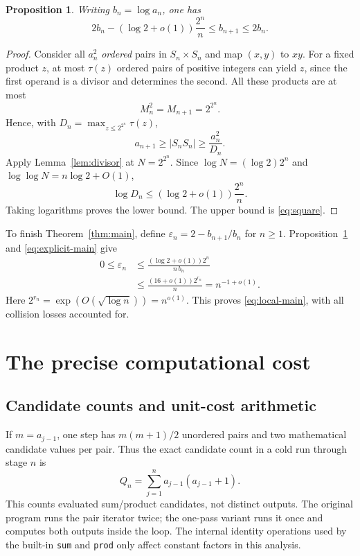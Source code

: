 \documentclass[11pt,a4paper]{article}
\newtheorem{proposition}[theorem]{Proposition}
\theoremstyle{definition}
\theoremstyle{remark}
\newcommand{\card}[1]{\lvert #1\rvert}
\begin{document}
\begin{proposition}\label{prop:local}
Writing $b_n=\log a_n$, one has
\begin{equation}\label{eq:local-b}
 2b_n-(\log2+o(1))\frac{2^n}{n}
 \le b_{n+1}\le2b_n.
\end{equation}
\end{proposition}
\begin{proof}
Consider all $a_n^2$ \emph{ordered} pairs in $S_n\times S_n$ and map
$(x,y)$ to $xy$. For a fixed product $z$, at most $\tau(z)$ ordered pairs
of positive integers can yield $z$, since the first operand is a divisor
and determines the second. All these products are at most
\[
 M_n^2=M_{n+1}=2^{2^n}.
\]
Hence, with $D_n=\max_{z\le2^{2^n}}\tau(z)$,
\[
 a_{n+1}\ge\card{S_nS_n}\ge\frac{a_n^2}{D_n}.
\]
Apply Lemma~\ref{lem:divisor} at $N=2^{2^n}$. Since
$\log N=(\log2)2^n$ and $\log\log N=n\log2+O(1)$,
\[
 \log D_n\le(\log2+o(1))\frac{2^n}{n}.
\]
Taking logarithms proves the lower bound. The upper bound is
\eqref{eq:square}.
\end{proof}

To finish Theorem~\ref{thm:main}, define
$\varepsilon_n=2-b_{n+1}/b_n$ for $n\ge1$.
Proposition~\ref{prop:local} and \eqref{eq:explicit-main} give
\begin{align*}
 0\le\varepsilon_n
 &\le\frac{(\log2+o(1))2^n}{n\,b_n}\\
 &\le\frac{(16+o(1))2^{r_n}}{n}
 =n^{-1+o(1)}.
\end{align*}
Here $2^{r_n}=\exp(O(\sqrt{\log n}))=n^{o(1)}$.
This proves \eqref{eq:local-main}, with all collision losses accounted for.

\section{The precise computational cost}\label{sec:cost}
\subsection{Candidate counts and unit-cost arithmetic}
If $m=a_{j-1}$, one step has $m(m+1)/2$ unordered pairs and two mathematical
candidate values per pair. Thus the exact candidate count in a cold run
through stage $n$ is
\begin{equation}\label{eq:candidates}
 Q_n=\sum_{j=1}^{n}a_{j-1}(a_{j-1}+1).
\end{equation}
This counts evaluated sum/product candidates, not distinct outputs.
The original program runs the pair iterator twice; the one-pass variant
runs it once and computes both outputs inside the loop. The internal
identity operations used by the built-in \texttt{sum} and \texttt{prod}
only affect constant factors in this analysis.
\end{document}
